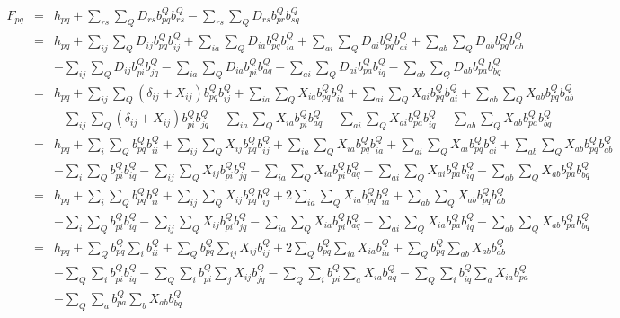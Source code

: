 \documentclass[aps,pra,groupedaddress]{revtex4-1}
\begin{document}
\begin{eqnarray}
F_{pq}  &=& h_{pq} + \sum_{rs}\sum_Q D_{rs} b_{pq}^Q b_{rs}^Q -\sum_{rs}\sum_Q D_{rs} b_{pr}^Q b_{sq}^Q  \\[0.2cm]
%
&=& h_{pq} + \sum_{ij}\sum_Q D_{ij} b_{pq}^Q b_{ij}^Q+ \sum_{ia}\sum_Q D_{ia} b_{pq}^Q b_{ia}^Q+
\sum_{ai}\sum_Q D_{ai} b_{pq}^Q b_{ai}^Q + \sum_{ab}\sum_Q D_{ab} b_{pq}^Q b_{ab}^Q \\
&& - \sum_{ij}\sum_Q D_{ij} b_{pi}^Q b_{jq}^Q - \sum_{ia}\sum_Q D_{ia} b_{pi}^Q b_{aq}^Q 
- \sum_{ai}\sum_Q D_{ai} b_{pa}^Q b_{iq}^Q - \sum_{ab}\sum_Q D_{ab} b_{pa}^Q b_{bq}^Q \\[0.2cm]
%
&=& h_{pq} + \sum_{ij}\sum_Q (\delta_{ij}+ X_{ij}) b_{pq}^Q b_{ij}^Q+ \sum_{ia}\sum_Q X_{ia} b_{pq}^Q b_{ia}^Q+
\sum_{ai}\sum_Q X_{ai} b_{pq}^Q b_{ai}^Q + \sum_{ab}\sum_Q X_{ab} b_{pq}^Q b_{ab}^Q \\
&& - \sum_{ij}\sum_Q (\delta_{ij}+X_{ij}) b_{pi}^Q b_{jq}^Q - \sum_{ia}\sum_Q X_{ia} b_{pi}^Q b_{aq}^Q 
- \sum_{ai}\sum_Q X_{ai} b_{pa}^Q b_{iq}^Q - \sum_{ab}\sum_Q X_{ab} b_{pa}^Q b_{bq}^Q \\[0.2cm]
%
&=& h_{pq} + \sum_{i}\sum_Q  b_{pq}^Q b_{ii}^Q+ \sum_{ij}\sum_Q X_{ij} b_{pq}^Q b_{ij}^Q +
\sum_{ia}\sum_Q X_{ia} b_{pq}^Q b_{ia}^Q+
\sum_{ai}\sum_Q X_{ai} b_{pq}^Q b_{ai}^Q + \sum_{ab}\sum_Q X_{ab} b_{pq}^Q b_{ab}^Q \\
&& -  \sum_{i}\sum_Q  b_{pi}^Q b_{iq}^Q    - \sum_{ij}\sum_Q X_{ij} b_{pi}^Q b_{jq}^Q - \sum_{ia}\sum_Q X_{ia} b_{pi}^Q b_{aq}^Q 
- \sum_{ai}\sum_Q X_{ai} b_{pa}^Q b_{iq}^Q - \sum_{ab}\sum_Q X_{ab} b_{pa}^Q b_{bq}^Q \\[0.9cm]
%
&=& h_{pq} + \sum_{i}\sum_Q  b_{pq}^Q b_{ii}^Q+ \sum_{ij}\sum_Q X_{ij} b_{pq}^Q b_{ij}^Q +
2\sum_{ia}\sum_Q X_{ia} b_{pq}^Q b_{ia}^Q+
 \sum_{ab}\sum_Q X_{ab} b_{pq}^Q b_{ab}^Q \\
&& -  \sum_{i}\sum_Q  b_{pi}^Q b_{iq}^Q    - \sum_{ij}\sum_Q X_{ij} b_{pi}^Q b_{jq}^Q - \sum_{ia}\sum_Q X_{ia} b_{pi}^Q b_{aq}^Q 
- \sum_{ai}\sum_Q X_{ia} b_{pa}^Q b_{iq}^Q - \sum_{ab}\sum_Q X_{ab} b_{pa}^Q b_{bq}^Q \\[0.9cm]
%
%
%
&=& h_{pq} + \sum_Q  b_{pq}^Q \sum_i b_{ii}^Q+  \sum_Q  b_{pq}^Q  \sum_{ij} X_{ij} b_{ij}^Q +
2\sum_Q  b_{pq}^Q  \sum_{ia}   X_{ia}  b_{ia}^Q+
\sum_Q b_{pq}^Q  \sum_{ab}  X_{ab}   b_{ab}^Q \\
&& - \sum_Q  \sum_i b_{pi}^Q b_{iq}^Q  
-  \sum_Q  \sum_{i} b_{pi}^Q  \sum_j X_{ij}  b_{jq}^Q 
- \sum_{Q}\sum_i  b_{pi}^Q  \sum_a X_{ia}  b_{aq}^Q 
- \sum_{Q}\sum_i    b_{iq}^Q  \sum_a X_{ia} b_{pa}^Q  \\
&& - \sum_{Q}\sum_a  b_{pa}^Q  \sum_b X_{ab} b_{bq}^Q 
%
%
%
%
\end{eqnarray}
\end{document}
